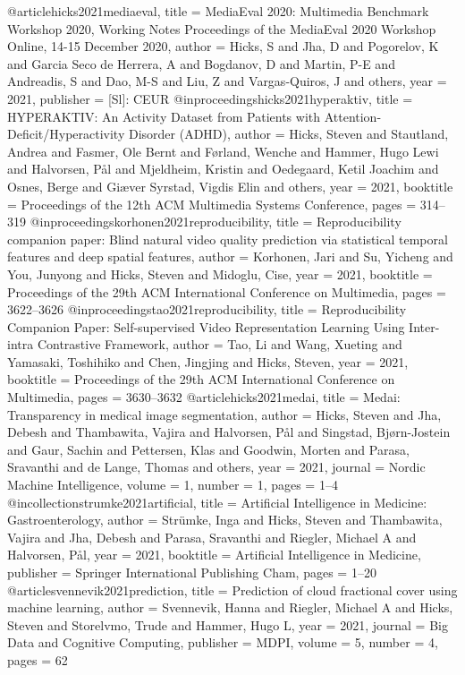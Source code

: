 @article{hicks2021mediaeval,
	title = {MediaEval 2020: Multimedia Benchmark Workshop 2020, Working Notes Proceedings of the MediaEval 2020 Workshop Online, 14-15 December 2020},
	author = {Hicks, S and Jha, D and Pogorelov, K and Garcia Seco de Herrera, A and Bogdanov, D and Martin, P-E and Andreadis, S and Dao, M-S and Liu, Z and Vargas-Quiros, J and others},
	year = 2021,
	publisher = {[Sl]: CEUR}
}
@inproceedings{hicks2021hyperaktiv,
	title = {HYPERAKTIV: An Activity Dataset from Patients with Attention-Deficit/Hyperactivity Disorder (ADHD)},
	author = {Hicks, Steven and Stautland, Andrea and Fasmer, Ole Bernt and F{\o}rland, Wenche and Hammer, Hugo Lewi and Halvorsen, P{\aa}l and Mjeldheim, Kristin and Oedegaard, Ketil Joachim and Osnes, Berge and Gi{\ae}ver Syrstad, Vigdis Elin and others},
	year = 2021,
	booktitle = {Proceedings of the 12th ACM Multimedia Systems Conference},
	pages = {314--319}
}
@inproceedings{korhonen2021reproducibility,
	title = {Reproducibility companion paper: Blind natural video quality prediction via statistical temporal features and deep spatial features},
	author = {Korhonen, Jari and Su, Yicheng and You, Junyong and Hicks, Steven and Midoglu, Cise},
	year = 2021,
	booktitle = {Proceedings of the 29th ACM International Conference on Multimedia},
	pages = {3622--3626}
}
@inproceedings{tao2021reproducibility,
	title = {Reproducibility Companion Paper: Self-supervised Video Representation Learning Using Inter-intra Contrastive Framework},
	author = {Tao, Li and Wang, Xueting and Yamasaki, Toshihiko and Chen, Jingjing and Hicks, Steven},
	year = 2021,
	booktitle = {Proceedings of the 29th ACM International Conference on Multimedia},
	pages = {3630--3632}
}
@article{hicks2021medai,
	title = {Medai: Transparency in medical image segmentation},
	author = {Hicks, Steven and Jha, Debesh and Thambawita, Vajira and Halvorsen, P{\aa}l and Singstad, Bj{\o}rn-Jostein and Gaur, Sachin and Pettersen, Klas and Goodwin, Morten and Parasa, Sravanthi and de Lange, Thomas and others},
	year = 2021,
	journal = {Nordic Machine Intelligence},
	volume = 1,
	number = 1,
	pages = {1--4}
}
@incollection{strumke2021artificial,
	title = {Artificial Intelligence in Medicine: Gastroenterology},
	author = {Str{\"u}mke, Inga and Hicks, Steven and Thambawita, Vajira and Jha, Debesh and Parasa, Sravanthi and Riegler, Michael A and Halvorsen, P{\aa}l},
	year = 2021,
	booktitle = {Artificial Intelligence in Medicine},
	publisher = {Springer International Publishing Cham},
	pages = {1--20}
}
@article{svennevik2021prediction,
	title = {Prediction of cloud fractional cover using machine learning},
	author = {Svennevik, Hanna and Riegler, Michael A and Hicks, Steven and Storelvmo, Trude and Hammer, Hugo L},
	year = 2021,
	journal = {Big Data and Cognitive Computing},
	publisher = {MDPI},
	volume = 5,
	number = 4,
	pages = 62
}
